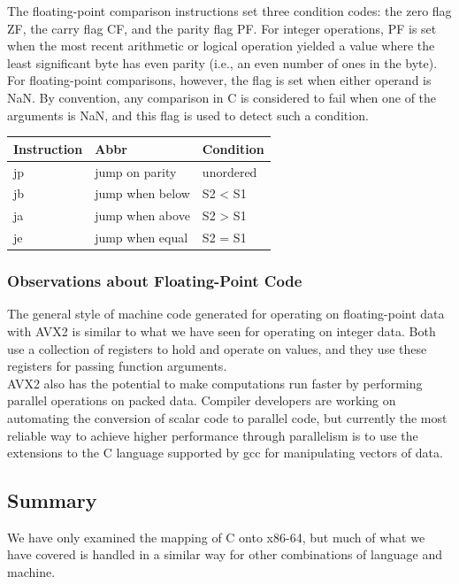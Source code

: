 \documentclass[11pt]{article}
\begin{document}
The floating-point comparison instructions set three condition codes: the zero flag ZF, the carry flag CF, and the parity flag PF. For integer operations, PF is set when the most recent arithmetic or logical operation yielded a value where the least significant byte has even parity (i.e., an even number of ones in the byte). For floating-point comparisons, however, the flag is set when either operand is NaN. By convention, any comparison in C is considered to fail when one of the arguments is NaN, and this flag is used to detect such a condition.\\

\begin{center}
\begin{tabular}{lll}
Instruction & Abbr & Condition\\
\hline
jp & jump on parity & unordered\\
jb & jump when below & S2 < S1\\
ja & jump when above & S2 > S1\\
je & jump when equal & S2 = S1\\
\end{tabular}
\end{center}


\subsubsection{Observations about Floating-Point Code}
\label{sec:orgbcb9522}
The general style of machine code generated for operating on floating-point data with AVX2 is similar to what we have seen for operating on integer data. Both use a collection of registers to hold and operate on values, and they use these registers for passing function arguments.\\

AVX2 also has the potential to make computations run faster by performing parallel operations on packed data. Compiler developers are working on automating the conversion of scalar code to parallel code, but currently the most reliable way to achieve higher performance through parallelism is to use the extensions to the C language supported by gcc for manipulating vectors of data.\\


\subsection{Summary}
\label{sec:org7e5654b}
We have only examined the mapping of C onto x86-64, but much of what we have covered is handled in a similar way for other combinations of language and machine.\\
\end{document}
